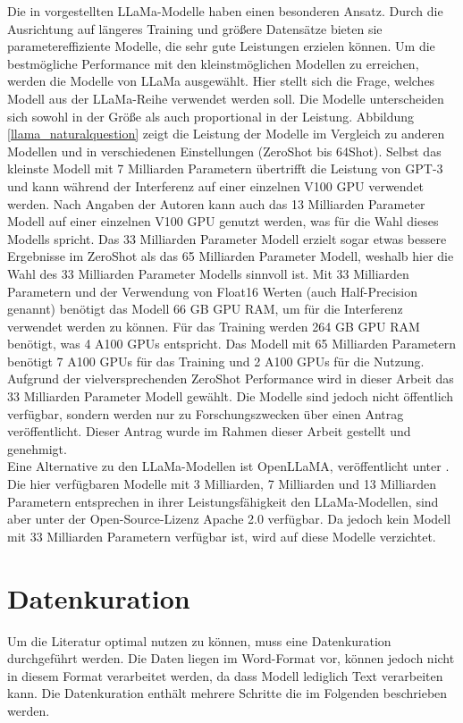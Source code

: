 Die in \citet{llama} vorgestellten LLaMa-Modelle haben einen besonderen Ansatz.
Durch die Ausrichtung auf längeres Training und größere Datensätze bieten sie parametereffiziente Modelle, die sehr gute Leistungen erzielen können.
Um die bestmögliche Performance mit den kleinstmöglichen Modellen zu erreichen, werden die Modelle von LLaMa ausgewählt.
Hier stellt sich die Frage, welches Modell aus der LLaMa-Reihe verwendet werden soll.
Die Modelle unterscheiden sich sowohl in der Größe als auch proportional in der Leistung.
Abbildung \ref{llama_naturalquestion} zeigt die Leistung der Modelle im Vergleich zu anderen Modellen und in verschiedenen Einstellungen (ZeroShot bis 64Shot).
Selbst das kleinste Modell mit 7 Milliarden Parametern übertrifft die Leistung von GPT-3 und kann während der Interferenz auf einer einzelnen V100 GPU verwendet werden.
Nach Angaben der Autoren kann auch das 13 Milliarden Parameter Modell auf einer einzelnen V100 GPU genutzt werden, was für die Wahl dieses Modells spricht.
Das 33 Milliarden Parameter Modell erzielt sogar etwas bessere Ergebnisse im ZeroShot als das 65 Milliarden Parameter Modell, weshalb hier die Wahl des 33 Milliarden Parameter Modells sinnvoll ist.
Mit 33 Milliarden Parametern und der Verwendung von Float16 Werten (auch Half-Precision genannt) benötigt das Modell 66 GB GPU RAM, um für die Interferenz verwendet werden zu können.
Für das Training werden 264 GB GPU RAM benötigt, was 4 A100 GPUs entspricht.
Das Modell mit 65 Milliarden Parametern benötigt 7 A100 GPUs für das Training und 2 A100 GPUs für die Nutzung.
Aufgrund der vielversprechenden ZeroShot Performance wird in dieser Arbeit das 33 Milliarden Parameter Modell gewählt.
Die Modelle sind jedoch nicht öffentlich verfügbar, sondern werden nur zu Forschungszwecken über einen Antrag veröffentlicht.
Dieser Antrag wurde im Rahmen dieser Arbeit gestellt und genehmigt.\\

Eine Alternative zu den LLaMa-Modellen ist OpenLLaMA, veröffentlicht unter \citet{openllama}.
Die hier verfügbaren Modelle mit 3 Milliarden, 7 Milliarden und 13 Milliarden Parametern entsprechen in ihrer Leistungsfähigkeit den LLaMa-Modellen, sind aber unter der Open-Source-Lizenz Apache 2.0 verfügbar.
Da jedoch kein Modell mit 33 Milliarden Parametern verfügbar ist, wird auf diese Modelle verzichtet.\\

\section{Datenkuration}
Um die Literatur optimal nutzen zu können, muss eine Datenkuration durchgeführt werden.
Die Daten liegen im Word-Format vor, können jedoch nicht in diesem Format verarbeitet werden, da dass Modell lediglich Text verarbeiten kann.
Die Datenkuration enthält mehrere Schritte die im Folgenden beschrieben werden.\\

